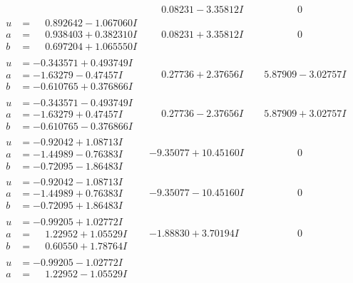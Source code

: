 \documentclass[1p]{elsarticle_modified}
\theoremstyle{definition}
\begin{document}
$$\begin{array}{c|c|c}
 & \phantom{-}0.08231 - 3.35812 I & \phantom{-0.000000 } 0 \\ \hline\begin{aligned}
u &= \phantom{-}0.892642 - 1.067060 I \\
a &= \phantom{-}0.938403 + 0.382310 I \\
b &= \phantom{-}0.697204 + 1.065550 I\end{aligned}
 & \phantom{-}0.08231 + 3.35812 I & \phantom{-0.000000 } 0 \\ \hline\begin{aligned}
u &= -0.343571 + 0.493749 I \\
a &= -1.63279 - 0.47457 I \\
b &= -0.610765 + 0.376866 I\end{aligned}
 & \phantom{-}0.27736 + 2.37656 I & \phantom{-}5.87909 - 3.02757 I \\ \hline\begin{aligned}
u &= -0.343571 - 0.493749 I \\
a &= -1.63279 + 0.47457 I \\
b &= -0.610765 - 0.376866 I\end{aligned}
 & \phantom{-}0.27736 - 2.37656 I & \phantom{-}5.87909 + 3.02757 I \\ \hline\begin{aligned}
u &= -0.92042 + 1.08713 I \\
a &= -1.44989 - 0.76383 I \\
b &= -0.72095 - 1.86483 I\end{aligned}
 & -9.35077 + 10.45160 I & \phantom{-0.000000 } 0 \\ \hline\begin{aligned}
u &= -0.92042 - 1.08713 I \\
a &= -1.44989 + 0.76383 I \\
b &= -0.72095 + 1.86483 I\end{aligned}
 & -9.35077 - 10.45160 I & \phantom{-0.000000 } 0 \\ \hline\begin{aligned}
u &= -0.99205 + 1.02772 I \\
a &= \phantom{-}1.22952 + 1.05529 I \\
b &= \phantom{-}0.60550 + 1.78764 I\end{aligned}
 & -1.88830 + 3.70194 I & \phantom{-0.000000 } 0 \\ \hline\begin{aligned}
u &= -0.99205 - 1.02772 I \\
a &= \phantom{-}1.22952 - 1.05529 I \\

\end{aligned}
\end{array}$$
\end{document}
